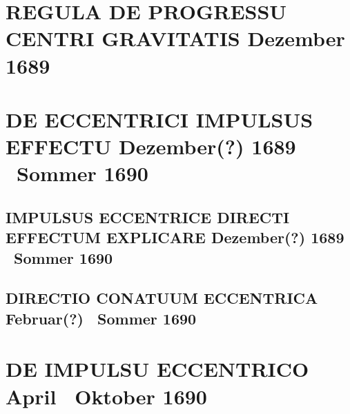 \documentclass[%
fontsize=10pt,
]{scrbook}
\DeclareRobustCommand{\bracks}[1]{%
\textup{\lbrack}#1\textup{\rbrack}}
\begin{document}
\chapter[tocentry={Regula de progressu centri gravitatis
\enskip\bracks{Dezember 1689}},
head={Regula de progressu centri gravitatis}]%
{\MakeUppercase{Regula de progressu centri gravitatis}
\newline\bracks{Dezember 1689}}
\label{66097}




\chapter[tocentry={De eccentrici impulsus effectu
\enskip\bracks{%
Dezember\;(?)} 1689 \textendash\ Sommer 1690%
},
head={De eccentrici impulsus effectu}]%
{\MakeUppercase{De eccentrici impulsus effectu}
\newline\bracks{%
Dezember\;(?) 1689 \textendash\ Sommer 1690%
}}
\label{impulsuseccentricus}



\section[tocentry={Impulsus eccentrice directi effectum explicare
\enskip\bracks{%
Dezember\;(?) 1689 \textendash\ Sommer 1690%
}},
head={Impulsus eccentrice directi effectus}]%
{\MakeUppercase{Impulsus eccentrice directi effectum explicare}
\newline\bracks{%
Dezember\;(?) 1689 \textendash\ Sommer 1690%
}%
}
\label{60142+60297}



\section[tocentry={Directio conatuum eccentrica
\enskip\bracks{%
Februar\;(?) \textendash\ Sommer 1690%
}},
head={Directio conatuum eccentrica}]%
{\MakeUppercase{Directio conatuum eccentrica}
\newline\bracks{%
Februar\;(?) \textendash\ Sommer 1690%
}}
\label{60299}




\chapter[tocentry={De impulsu eccentrico
\enskip\bracks{%
April \textendash\ Oktober 1690%
}},
head={De impulsu eccentrico}]%
{\MakeUppercase{De impulsu eccentrico}
\newline\bracks{%
April \textendash\ Oktober 1690%
}}
\label{60300}

\end{document}

